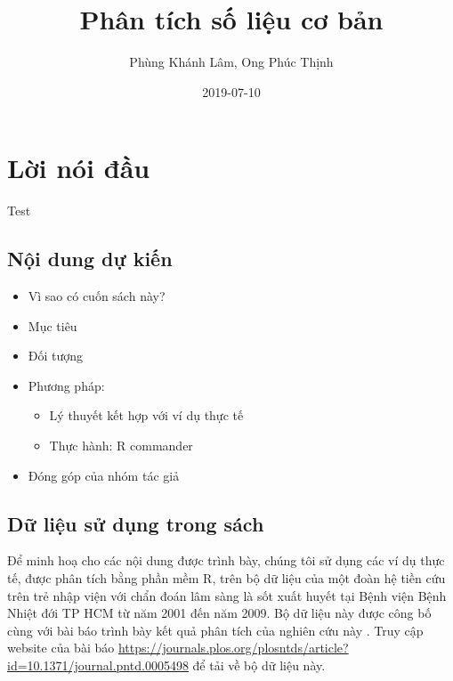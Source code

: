 \documentclass[]{tufte-book}
\title{Phân tích số liệu cơ bản}
\author{Phùng Khánh Lâm, Ong Phúc Thịnh}
\date{2019-07-10}
\providecommand{\tightlist}{%
  \setlength{\itemsep}{0pt}\setlength{\parskip}{0pt}}
\begin{document}
\maketitle



{
\setcounter{tocdepth}{1}
\tableofcontents
}

\hypertarget{li-noi-u}{%
\chapter*{Lời nói đầu}\label{li-noi-u}}

Test

\hypertarget{ni-dung-d-kin}{%
\section{Nội dung dự kiến}\label{ni-dung-d-kin}}

\begin{itemize}
\tightlist
\item
  Vì sao có cuốn sách này?
\item
  Mục tiêu
\item
  Đối tượng
\item
  Phương pháp:

  \begin{itemize}
  \tightlist
  \item
    Lý thuyết kết hợp với ví dụ thực tế
  \item
    Thực hành: R commander
  \end{itemize}
\item
  Đóng góp của nhóm tác giả
\end{itemize}

\hypertarget{d-liu-s-dung-trong-sach}{%
\section{Dữ liệu sử dụng trong sách}\label{d-liu-s-dung-trong-sach}}

Để minh hoạ cho các nội dung được trình bày, chúng tôi sử dụng các ví dụ thực tế, được phân tích bằng phần mềm R, trên bộ dữ liệu của một đoàn hệ tiền cứu trên trẻ nhập viện với chẩn đoán lâm sàng là sốt xuất huyết tại Bệnh viện Bệnh Nhiệt đới TP HCM từ năm 2001 đến năm 2009. Bộ dữ liệu này được công bố cùng với bài báo trình bày kết quả phân tích của nghiên cứu này \citep{Lam_2017}. Truy cập website của bài báo \url{https://journals.plos.org/plosntds/article?id=10.1371/journal.pntd.0005498} để tải về bộ dữ liệu này.
\end{document}
